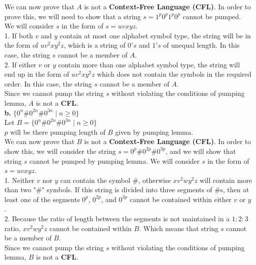 \documentclass[12pt]{article}
\begin{document}
We can now prove that $A$ is not a \textbf{Context-Free Language (CFL)}.
In order to prove this, we will need to show that a string $s = 1^p 0^p 1^p 0^p$
cannot be pumped. We will consider $s$ in the form of $s = uvxyz$. \\

1. If both $v$ and $y$ contain at most one alphabet symbol type, the string
will be in the form of $u v^2 x y^2 z$, which is a string of $0's$ and $1's$
of unequal length. In this case, the string $s$ cannot be a member of $A$. \\

2. If either $v$ or $y$ contain more than one alphabet symbol type, the string
will end up in the form of $u v^2 x y^2 z$ which does not contain the
symbols in the required order. In this case, the string $s$ cannot be a
member of $A$. \\

Since we cannot pump the string $s$ without violating the conditions of
pumping lemma, $A$ is not a \textbf{CFL}. \\


\textbf{b.} $\{0^n \# 0^{2n} \# 0^{3n} \; | \; n \geq 0 \} $ \\

Let $B = \{0^n \# 0^{2n} \# 0^{3n} \; | \; n \geq 0 \} $ \\
$p$ will be there pumping length of $B$ given by pumping lemma. \\

We can now prove that $B$ is not a \textbf{Context-Free Language (CFL)}.
In order to show this, we will consider the string $s = 0^p \# 0^{2p} \# 0^{3p}$,
and we will show that string $s$ cannot be pumped by pumping lemma. We will
consider $s$ in the form of $s = uvxyz$. \\

1. Neither $v$ nor $y$ can contain the symbol $\#$, otherwise $x v^2 w y^2 z$
will contain more than two "\#" symbols. If this string is divided into
three segments of $\#$s, then at least one of the segments $0^p$,
$0^{2p}$, and $0^{3p}$ cannot be contained within either $v$ or $y$. \\

2. Because the ratio of length between the segments is not maintained in
a $1:2:3$ ratio, $x v^2 w y^2 z$ cannot be contained within $B$.
Which means that string $s$ cannot be a member of $B$. \\

Since we cannot pump the string $s$ without violating the conditions of
pumping lemma, $B$ is not a \textbf{CFL}. \\
\end{document}
